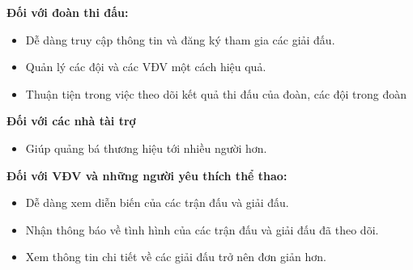 \noindent
\textbf{Đối với đoàn thi đấu:}
\vspace{-0.5em}
\begin{itemize}[leftmargin=1.5cm, label={--}]
  \item Dễ dàng truy cập thông tin và đăng ký tham gia các giải đấu.
  \item Quản lý các đội và các VĐV một cách hiệu quả.
  \item Thuận tiện trong việc theo dõi kết quả thi đấu của đoàn, các đội trong đoàn
\end{itemize}

\noindent
\textbf{Đối với các nhà tài trợ}
\vspace{-0.5em}
\begin{itemize}[leftmargin=1.5cm, label={--}]
  \item Giúp quảng bá thương hiệu tới nhiều người hơn.
\end{itemize}

\noindent
\textbf{Đối với VĐV và những người yêu thích thể thao:}
\vspace{-0.5em}
\begin{itemize}[leftmargin=1.5cm, label={--}]
  \item Dễ dàng xem diễn biến của các trận đấu và giải đấu.
  \item Nhận thông báo về tình hình của các trận đấu và giải đấu đã theo dõi.
  \item Xem thông tin chi tiết về các giải đấu trở nên đơn giản hơn.
\end{itemize}
